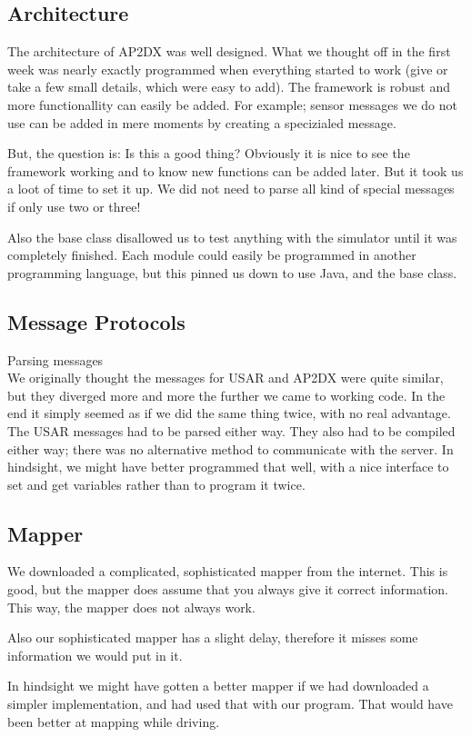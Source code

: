 \subsection{Architecture}
The architecture of AP2DX was well designed. What we thought off in the first week
was nearly exactly programmed when everything started to work (give or take a few
small details, which were easy to add). The framework is robust and more functionallity
can easily be added. For example; sensor messages we do not use can be added in mere moments 
by creating a specizialed message. 

But, the question is: Is this a good thing? Obviously it is nice to see the framework working
and to know new functions can be added later. But it took us a loot of time to set it up. We 
did not need to parse all kind of special messages if only use two or three! 

Also the base class disallowed us to test anything with the simulator until it was completely 
finished. Each module could easily be programmed in another programming language, but this
pinned us down to use Java, and the base class. 

\subsection{Message Protocols}
Parsing messages \\
We originally thought the messages for USAR and AP2DX were quite similar, but they diverged more
and more the further we came to working code. In the end it simply seemed as if we did the same
thing twice, with no real advantage. The USAR messages had to be parsed either way. They also
had to be compiled either way; there was no alternative method to communicate with the server. 
In hindsight, we might have better programmed that well, with a nice interface to set and get
variables rather than to program it twice. 

\subsection{Mapper}
We downloaded a complicated, sophisticated mapper from the internet. This is
good, but the mapper does assume that you always give it correct information.
This way, the mapper does not always work.

Also our sophisticated mapper has a slight delay, therefore it misses some
information we would put in it.

In hindsight we might have gotten a better mapper if we had downloaded a simpler
implementation, and had used that with our program. That would have been better
at mapping while driving.

